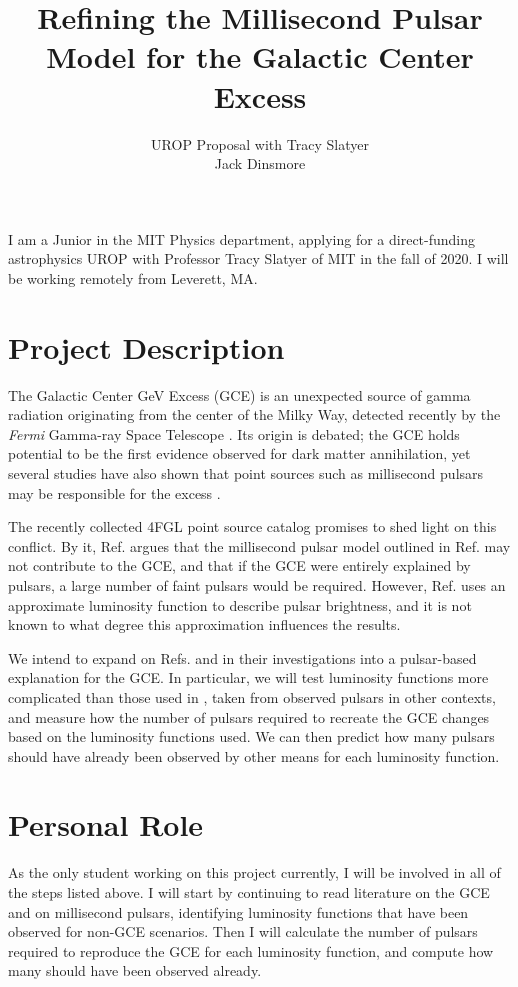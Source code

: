 \documentclass[11pt]{article}
\title{Refining the Millisecond Pulsar Model for the Galactic Center Excess}
\author{\Large{UROP Proposal with Tracy Slatyer}\vspace{12pt}\\Jack Dinsmore}
\begin{document}
\maketitle

\begin{displayquote}
    I am a Junior in the MIT Physics department, applying for a direct-funding astrophysics UROP with Professor Tracy Slatyer of MIT in the fall of 2020. I will be working remotely from Leverett, MA.
\end{displayquote}

\section{Project Description}
The Galactic Center GeV Excess (GCE) is an unexpected source of gamma radiation originating from the center of the Milky Way, detected  recently by the \textit{Fermi} Gamma-ray Space Telescope \cite{fermilab, tracy3}. Its origin is debated; the GCE holds potential to be the first evidence observed for dark matter annihilation, yet several studies have also shown that point sources such as millisecond pulsars may be responsible for the excess \cite{bartels, tracy1}.

The recently collected 4FGL point source catalog promises to shed light on this conflict. By it, Ref. \cite{fermilab} argues that the millisecond pulsar model outlined in Ref. \cite{bartels} may not contribute to the GCE, and that if the GCE were entirely explained by pulsars, a large number of faint pulsars would be required. However, Ref. \cite{fermilab} uses an approximate luminosity function to describe pulsar brightness, and it is not known to what degree this approximation influences the results.

We intend to expand on Refs. \cite{bartels} and \cite{fermilab} in their investigations into a pulsar-based explanation for the GCE. In particular, we will test luminosity functions  more complicated than those used in \cite{fermilab}, taken from observed pulsars in other contexts, and measure how the number of pulsars required to recreate the GCE changes based on the luminosity functions used. We can then predict how many pulsars should have already been observed by other means for each luminosity function.


\section{Personal Role}
As the only student working on this project currently, I will be involved in all of the steps listed above. I will start by continuing to read literature on the GCE and on millisecond pulsars, identifying luminosity functions that have been observed for non-GCE scenarios. Then I will calculate the number of pulsars required to reproduce the GCE for each luminosity function, and compute how many should have been observed already.
\end{document}
